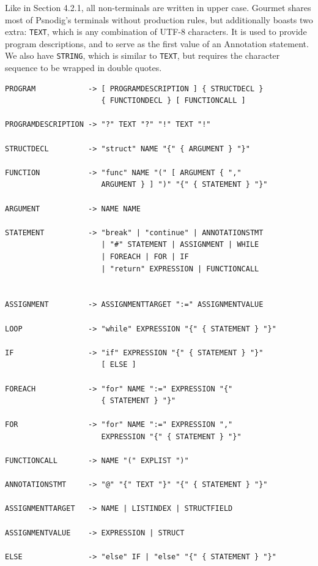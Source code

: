 Like in Section 4.2.1, all non-terminals are written in upper case. Gourmet shares most of Psnodig's terminals without production rules, but additionally boasts two extra: \texttt{TEXT}, which is any combination of UTF-8 characters. It is used to provide program descriptions, and to serve as the first value of an Annotation statement. We also have \texttt{STRING}, which is similar to \texttt{TEXT}, but requires the character sequence to be wrapped in double quotes. \\

\begin{lstlisting}[caption={Gourmet's grammar in EBNF notation.}, captionpos=b, label={The EBNF grammar of the Gourmet programming language.}]
PROGRAM            -> [ PROGRAMDESCRIPTION ] { STRUCTDECL }
                      { FUNCTIONDECL } [ FUNCTIONCALL ]

PROGRAMDESCRIPTION -> "?" TEXT "?" "!" TEXT "!"

STRUCTDECL         -> "struct" NAME "{" { ARGUMENT } "}"

FUNCTION           -> "func" NAME "(" [ ARGUMENT { ","
                      ARGUMENT } ] ")" "{" { STATEMENT } "}"

ARGUMENT           -> NAME NAME

STATEMENT          -> "break" | "continue" | ANNOTATIONSTMT
                      | "#" STATEMENT | ASSIGNMENT | WHILE
                      | FOREACH | FOR | IF
                      | "return" EXPRESSION | FUNCTIONCALL


ASSIGNMENT         -> ASSIGNMENTTARGET ":=" ASSIGNMENTVALUE

LOOP               -> "while" EXPRESSION "{" { STATEMENT } "}"

IF                 -> "if" EXPRESSION "{" { STATEMENT } "}"
                      [ ELSE ]

FOREACH            -> "for" NAME ":=" EXPRESSION "{"
                      { STATEMENT } "}"

FOR                -> "for" NAME ":=" EXPRESSION ","
                      EXPRESSION "{" { STATEMENT } "}"

FUNCTIONCALL       -> NAME "(" EXPLIST ")"

ANNOTATIONSTMT     -> "@" "{" TEXT "}" "{" { STATEMENT } "}"

ASSIGNMENTTARGET   -> NAME | LISTINDEX | STRUCTFIELD

ASSIGNMENTVALUE    -> EXPRESSION | STRUCT

ELSE               -> "else" IF | "else" "{" { STATEMENT } "}"


\end{lstlisting}
